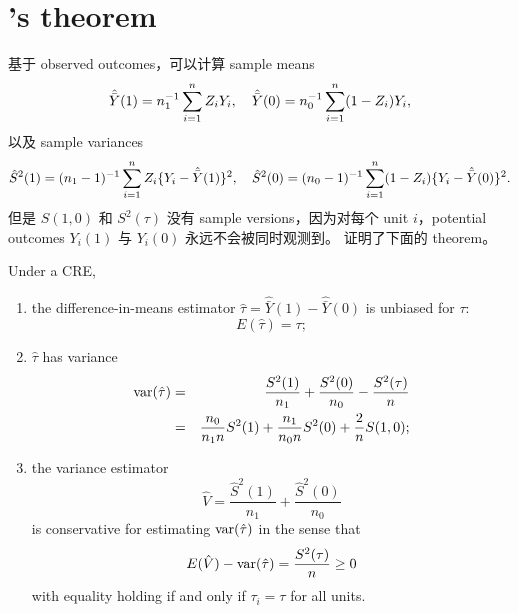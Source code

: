 \section{\citet{Neyman:1923}'s theorem}


基于 observed outcomes，可以计算 sample means
$$
\hat{\bar{Y}}(1) = n_1^{-1} \sum_{i=1}^n Z_i Y_i,\quad
\hat{\bar{Y}}(0) = n_0^{-1} \sum_{i=1}^n (1-Z_i) Y_i,
$$
以及 sample variances
$$
\hat{S}^2(1) = (n_1 - 1)^{-1} \sum_{i=1}^n Z_i  \{  Y_i - \hat{\bar{Y}}(1) \}^2,\quad
\hat{S}^2(0) = (n_0 - 1)^{-1} \sum_{i=1}^n (1-Z_i)  \{  Y_i - \hat{\bar{Y}}(0) \}^2 .
$$
但是 $S(1,0)$ 和 $S^2(\tau)$ 没有 sample versions，因为对每个 unit $i$，potential outcomes $Y_i(1)$ 与 $Y_i(0)$ 永远不会被同时观测到。\citet{Neyman:1923} 证明了下面的 theorem。




\begin{theorem}
\label{thm::neyman1923}
Under a CRE,
\begin{enumerate}
\item
the difference-in-means estimator $\hat{\tau} =\hat{\bar{Y}}(1) -  \hat{\bar{Y}}(0)$ is unbiased for $\tau$:
$$
E(\hat{\tau}) =\tau ;
$$
\item
$\hat{\tau} $ has variance
\begin{eqnarray}
\textup{var}(\hat{\tau})  &=&  \frac{S^2(1)}{n_1} + \frac{S^2(0)}{n_0} - \frac{S^2(\tau)}{n} \label{eq::neyman23var} \\
&=& \frac{n_0}{n_1 n} S^2(1) + \frac{n_1}{n_0 n} S^2(0) + \frac{2}{n} S(1,0) ;  \label{eq::neyman23var-equivalent}
\end{eqnarray}
\item\label{neyman-3}
the variance estimator
$$
\hat{V} = \frac{\hat{S}^2(1)}{n_1} + \frac{\hat{S}^2(0)}{n_0}
$$
is conservative for estimating $\textup{var}(\hat{\tau})$ in the sense that
$$
E(\hat{V} ) - \textup{var}(\hat{\tau})  = \frac{S^2(\tau)}{n}  \geq 0
$$
with equality holding if and only if $\tau_i = \tau$ for all units.
\end{enumerate}
\end{theorem}

